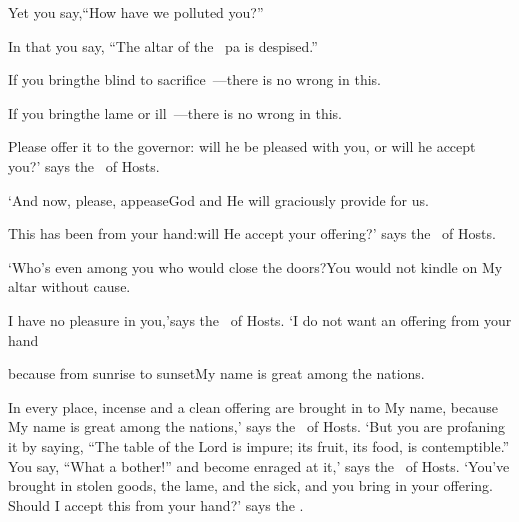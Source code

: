\begin{inparaenum}
  \pc Yet you say,\pa ``How have we polluted you?''%
  
  \pc In that you say,%
  ``The altar of the \lord\ pa is despised.''%
  
  \pb {} If you bring\pa the blind to sacrifice~---\pa there is no wrong in this.%
  
  \pc If you bring\pa the lame or ill~---\pa there is no wrong in this.%
  
  \pc Please offer it to the governor:%
  \pa will he be pleased with you, or will he accept you?'%
  \pa says the \lord\ of Hosts.%
  
  \pb {} `And now, please, appease\pa God and He will graciously provide for us.%
  
  \pc This has been from your hand:\pa will He accept your offering?'%
  \pa says the \lord\ of Hosts.%
  
  \pb {} `Who's even among you who would close the doors?\pa You would not kindle on My altar without cause.%
  
  \pc I have no pleasure in you,'\pa says the \lord\ of Hosts.%
  \pa `I do not want an offering from your hand%
  
  \pb {}%
  because from sunrise to sunset\pa My name is great among the nations.\smallskip%
  
  \noindent In every place, incense and a clean%
  offering are brought in to My name, because My name is great among the nations,' says the \lord\ of Hosts.%
   `But you are profaning it by saying, ``The table of the Lord is impure; its fruit, its food, is contemptible.''%
   You say, ``What a bother!'' and become enraged at it,' says the \lord\ of Hosts. `You've brought in stolen goods, the lame, and the sick, and you bring in your offering. Should I accept this from your hand?' says the \lord.%
  

\end{inparaenum}
